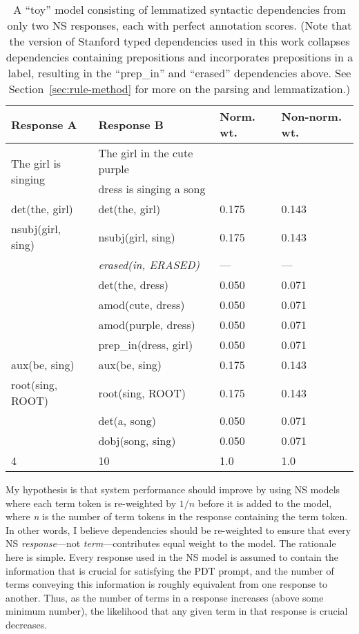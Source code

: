 \begin{table}[htb!]
\begin{center}
\begin{tabular}{|l|l|l|l|}
\hline
Response A & Response B & Norm. wt. & Non-norm. wt.\\
\hline
\multirow{2}{*}{The girl is singing} & The girl in the cute purple & & \\
& dress is singing a song & & \\
\hline
\hline
det(the, girl) & det(the, girl) & 0.175 & 0.143 \\
\hline
nsubj(girl, sing) & nsubj(girl, sing) & 0.175 & 0.143 \\
\hline
& \textit{erased(in, ERASED)} & --- & --- \\
\hline
& det(the, dress) & 0.050 & 0.071 \\
\hline
& amod(cute, dress) & 0.050 & 0.071 \\
\hline
& amod(purple, dress) & 0.050 & 0.071 \\
\hline
& prep\_in(dress, girl) & 0.050 & 0.071 \\
\hline
aux(be, sing) & aux(be, sing) & 0.175 & 0.143 \\
\hline
root(sing, ROOT) & root(sing, ROOT) & 0.175 & 0.143 \\
\hline
& det(a, song) & 0.050 & 0.071 \\
\hline
& dobj(song, sing) & 0.050 & 0.071 \\
\hline
\hline
4 & 10 & 1.0 & 1.0 \\
\hline
\end{tabular}
\caption{\label{tab:normalize-responses-deps} A ``toy'' model consisting of lemmatized syntactic dependencies from only two NS responses, each with perfect annotation scores. (Note that the version of Stanford typed dependencies used in this work collapses dependencies containing prepositions and incorporates prepositions in a label, resulting in the ``prep\_in'' and ``erased'' dependencies above. See Section~\ref{sec:rule-method} for more on the parsing and lemmatization.)}
\end{center}
\end{table}

My hypothesis is that system performance should improve by using NS models where each term token is re-weighted by $1/\textit{n}$ before it is added to the model, where \textit{n} is the number of term tokens in the response containing the term token. In other words, I believe dependencies should be re-weighted to ensure that every NS \textit{response}---not \textit{term}---contributes equal weight to the model. The rationale here is simple. Every response used in the NS model is assumed to contain the information that is crucial for satisfying the PDT prompt, and the number of terms conveying this information is roughly equivalent from one response to another. Thus, as the number of terms in a response increases (above some minimum number), the likelihood that any given term in that response is crucial decreases.

